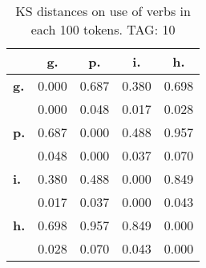 \begin{table}[h!]
\begin{center}
\begin{tabular}{| l || c | c | c | c |}\hline
 & {\bf g.} & {\bf p.} & {\bf i.} & {\bf h.} \\\hline\hline
{\bf g.} & 0.000 & 0.687 & 0.380 & 0.698 \\
{\bf } & 0.000 & 0.048 & 0.017 & 0.028 \\\hline
{\bf p.} & 0.687 & 0.000 & 0.488 & 0.957 \\
{\bf } & 0.048 & 0.000 & 0.037 & 0.070 \\\hline
{\bf i.} & 0.380 & 0.488 & 0.000 & 0.849 \\
{\bf } & 0.017 & 0.037 & 0.000 & 0.043 \\\hline
{\bf h.} & 0.698 & 0.957 & 0.849 & 0.000 \\
{\bf } & 0.028 & 0.070 & 0.043 & 0.000 \\\hline
\end{tabular}
\caption{KS distances on use of verbs in each 100 tokens. TAG: 10}
\end{center}
\end{table}